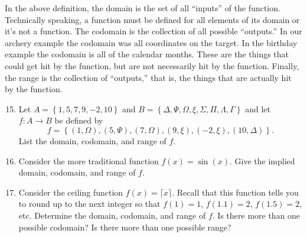 \documentclass[12 pt]{article}
\newcommand{\set}[1]{\left\{#1\right\}}
\theoremstyle{definition}
\theoremstyle{plain}
\theoremstyle{mytheorem}
\theoremstyle{myexample}
\theoremstyle{mydefinition}
\begin{document}
In the above definition, the domain is the set of all ``inputs'' of the function.  Technically speaking, a function must be defined for all elements of its domain or it's not a function.  The codomain is the collection of all possible ``outputs.'' In our archery example the codomain was all coordinates on the target.  In the birthday example the codomain is all of the calendar months.  These are the things that could get hit by the function, but are not necessarily hit by the function.  Finally, the range is the collection of ``outputs,'' that is, the things that are actually hit by the function.

\begin{enumerate} \setcounter{enumi}{14}
\item Let $A = \set{1,5,7,9,-2,10}$ and $B = \set{ \Delta, \Psi, \Omega, \xi, \Sigma, \Pi , \Lambda, \Gamma}$ and let $f:A \to B$ be defined by 
\[f = \set{(1,\Omega), (5, \Psi), (7, \Omega), (9,\xi), (-2,\xi),(10,\Delta)}.\]
List the domain, codomain, and range of $f$.

\vspace{1.5in}

\item Consider the more traditional function $f(x)=\sin(x)$.  Give the implied domain, codomain, and range of $f$.

\vspace{1.5in}

\item Consider the ceiling function $f(x) = \lceil x \rceil$.  Recall that this function tells you to round up to the next integer so that $f(1)=1$, $f(1.1)=2$, $f(1.5)=2$, etc.  Determine the domain, codomain, and range of $f$.  Is there more than one possible codomain?  Is there more than one possible range?
\end{enumerate}
\end{document}
